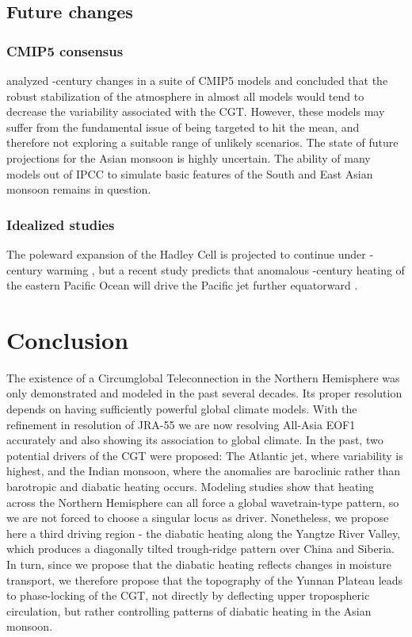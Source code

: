 \subsection{Future changes}
\subsubsection{CMIP5 consensus}
	\citet{Lee2014} analyzed -century changes in a suite of CMIP5 models and concluded that the robust stabilization of the atmosphere in almost all models would tend to decrease the variability associated with the CGT. However, these models may suffer from the fundamental issue of being targeted to hit the mean, and therefore not exploring a suitable range of unlikely scenarios. The state of future projections for the Asian monsoon is highly uncertain. The ability of many models out of IPCC to simulate basic features of the South and East Asian monsoon remains in question.

\subsubsection{Idealized studies}
	The poleward expansion of the Hadley Cell is projected to continue under -century warming \citep{Frierson2007,Lu2007,Kang2012}, but a recent study predicts that anomalous -century heating of the eastern Pacific Ocean will drive the Pacific jet further equatorward \citep{Park2014}.
		 
\section{Conclusion}

	The existence of a Circumglobal Teleconnection in the Northern Hemisphere was only demonstrated and modeled in the past several decades. Its proper resolution depends on having sufficiently powerful global climate models. With the refinement in resolution of JRA-55 we are now resolving All-Asia EOF1 accurately and also showing its association to global climate. In the past, two potential drivers of the CGT were proposed: The Atlantic jet, where variability is highest, and the Indian monsoon, where the anomalies are baroclinic rather than barotropic and diabatic heating occurs. Modeling studies show that heating across the Northern Hemisphere can all force a global wavetrain-type pattern, so we are not forced to choose a singular locus as driver. Nonetheless, we propose here a third driving region - the diabatic heating along the Yangtze River Valley, which produces a diagonally tilted trough-ridge pattern over China and Siberia. In turn, since we propose that the diabatic heating reflects changes in moisture transport, we therefore propose that the topography of the Yunnan Plateau leads to phase-locking of the CGT, not directly by deflecting upper tropospheric circulation, but rather controlling patterns of diabatic heating in the Asian monsoon.
	
